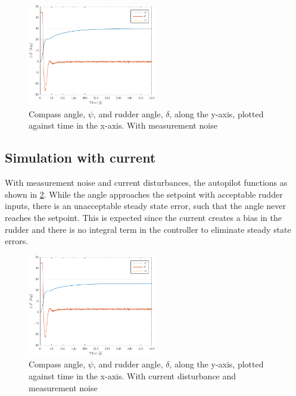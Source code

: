 \begin{figure}[ht!]
    \centering
    \includegraphics[width=0.5\textwidth]{images/3b-psi_and_rudder}
    \caption{Compass angle, $\psi$, and rudder angle, $\delta$, along the y-axis, plotted against time in the x-axis. With measurement noise}
    \label{fig:3b-psi_and_rudder}
\end{figure}

\subsection{Simulation with current}
With measurement noise and current disturbances, the autopilot functions as shown in \cref{fig:3b-psi_and_rudder_w_current}. While the angle approaches the setpoint with acceptable rudder inputs, there is an unacceptable steady state error, such that the angle never reaches the setpoint. This is expected since the current creates a bias in the rudder and there is no integral term in the controller to eliminate steady state errors.

\begin{figure}[ht!]
    \centering
    \includegraphics[width=0.5\textwidth]{images/3c-psi_and_rudder_w_current}
    \caption{Compass angle, $\psi$, and rudder angle, $\delta$, along the y-axis, plotted against time in the x-axis. With current disturbance and measurement noise}
    \label{fig:3b-psi_and_rudder_w_current}
\end{figure}

